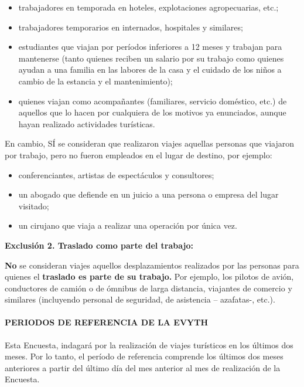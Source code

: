 \documentclass[
  openany]{book}
\begin{document}
\begin{itemize}
\item
  trabajadores en temporada en hoteles, explotaciones agropecuarias, etc.;
\item
  trabajadores temporarios en internados, hospitales y similares;
\item
  estudiantes que viajan por períodos inferiores a 12 meses y trabajan para mantenerse (tanto quienes reciben un salario por su trabajo como quienes ayudan a una familia en las labores de la casa y el cuidado de los niños a cambio de la estancia y el mantenimiento);
\item
  quienes viajan como acompañantes (familiares, servicio doméstico, etc.) de aquellos que lo hacen por cualquiera de los motivos ya enunciados, aunque hayan realizado actividades turísticas.
\end{itemize}

En cambio, SÍ se consideran que realizaron viajes aquellas personas que viajaron por trabajo, pero no fueron empleados en el lugar de destino, por ejemplo:

\begin{itemize}
\item
  conferenciantes, artistas de espectáculos y consultores;
\item
  un abogado que defiende en un juicio a una persona o empresa del lugar visitado;
\item
  un cirujano que viaja a realizar una operación por única vez.
\end{itemize}

\textbf{Exclusión 2. Traslado como parte del trabajo:}

\textbf{No} se consideran viajes aquellos desplazamientos realizados por las personas para quienes el \textbf{traslado es parte de su trabajo.} Por ejemplo, los pilotos de avión, conductores de camión o de ómnibus de larga distancia, viajantes de comercio y similares (incluyendo personal de seguridad, de asistencia -- azafatas-, etc.).

\hypertarget{periodos-de-referencia-de-la-evyth}{%
\paragraph{\texorpdfstring{\textbf{PERIODOS DE REFERENCIA DE LA EVYTH}}{PERIODOS DE REFERENCIA DE LA EVYTH}}\label{periodos-de-referencia-de-la-evyth}}

Esta Encuesta, indagará por la realización de viajes turísticos en los últimos dos meses. Por lo tanto, el período de referencia comprende los últimos dos meses anteriores a partir del último día del mes anterior al mes de realización de la Encuesta.
\end{document}

